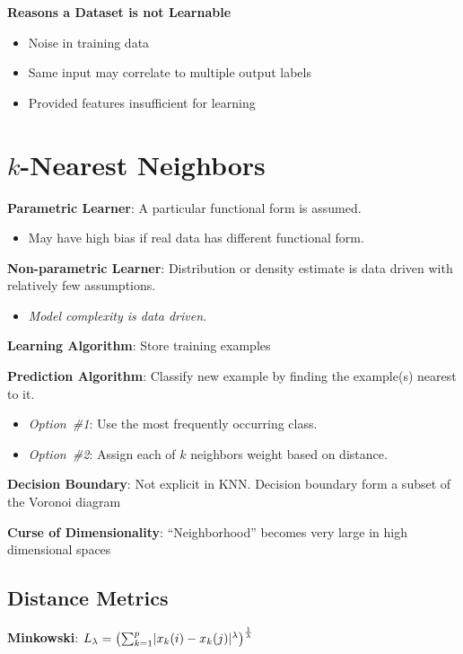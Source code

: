 \documentclass[10pt]{article}
\DeclarePairedDelimiter{\abs}{\lvert}{\rvert}
\begin{document}
\begin{multicols}{3}
  \textbf{Reasons a Dataset is not Learnable}
  \begin{itemize}
    \item Noise in training data
    \item Same input may correlate to multiple output labels
    \item Provided features insufficient for learning
  \end{itemize}

  \section{$k$-Nearest Neighbors}

  \textbf{Parametric Learner}: A particular functional form is assumed.
  \begin{itemize}
    \item May have high bias if real data has different functional form.
  \end{itemize}

  \textbf{Non-parametric Learner}: Distribution or density estimate is data driven with relatively few assumptions.
  \begin{itemize}
    \item \textit{Model complexity is data driven.}
  \end{itemize}

  \textbf{Learning Algorithm}: Store training examples

  \textbf{Prediction Algorithm}: Classify new example by finding the example(s) nearest to it.
  \begin{itemize}
    \item \textit{Option~\#1}: Use the most frequently occurring class.
    \item \textit{Option~\#2}: Assign each of $k$ neighbors weight based on distance.
  \end{itemize}

  \textbf{Decision Boundary}: Not explicit in KNN\@. Decision boundary form a subset of the Voronoi diagram

  \textbf{Curse of Dimensionality}: ``Neighborhood'' becomes very large in high dimensional spaces

  \subsection*{Distance Metrics}

  \vspace{8pt}\textbf{Minkowski}: $L_{\lambda} = \left( \sum_{k=1}^{p} \abs{x_k(i) - x_k(j)}^{\lambda}\right)^{\frac{1}{\lambda}}$


\end{multicols}
\end{document}
